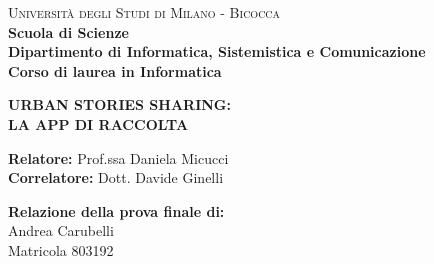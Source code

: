 \documentclass[a4paper,12pt, top=35, bottom=30, left=37, right=30, oneside]{report}
\begin{document}
    
    \begin{titlepage}
        
        \noindent
        \begin{minipage}[t]{0.19\textwidth}
        \end{minipage}
        \begin{minipage}[t]{0.81\textwidth}
        {
                {\textsc{Università degli Studi di Milano - Bicocca}} \\
                \textbf{Scuola di Scienze} \\
                \textbf{Dipartimento di Informatica, Sistemistica e Comunicazione} \\
                \textbf{Corso di laurea in Informatica} \\
                \par
        }
        \end{minipage}
        
	\vspace{40mm}
        
	\begin{center}
            {\LARGE{
                    \textbf{URBAN STORIES SHARING: \\ LA APP DI RACCOLTA}
                    \par
            }}
        \end{center}
        
        \vspace{50mm}

        \noindent
        {\large \textbf{Relatore:} Prof.ssa Daniela Micucci } \\

        \noindent
        {\large \textbf{Correlatore:} Dott. Davide Ginelli}
        
        \vspace{10mm}

        \begin{flushright}
            {\large \textbf{Relazione della prova finale di:}} \\
            \large{Andrea Carubelli} \\
            \large{Matricola 803192} 
        \end{flushright}
        

\end{titlepage}
\end{document}
